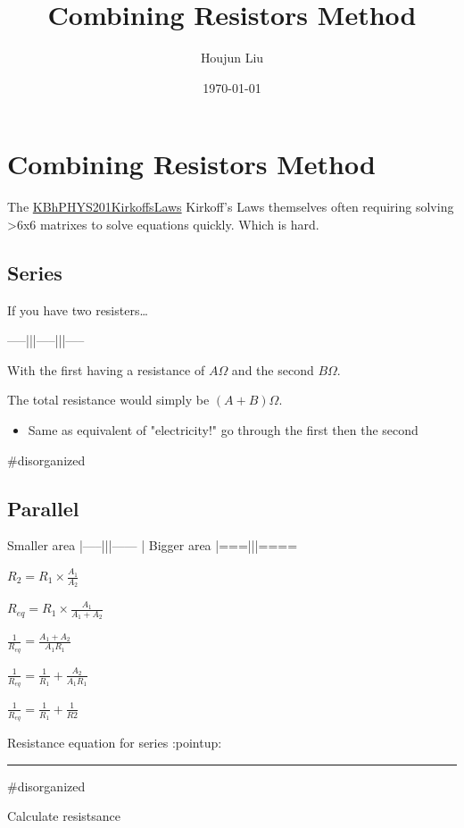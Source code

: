 \documentclass[letterpaper]{article}
\author{Houjun Liu}
\date{\today}
\title{Combining Resistors Method}
\renewcommand{\tableofcontents}{}
\begin{document}
\tableofcontents



\section{Combining Resistors Method}
\label{sec:org4479648}
The \href{KBhPHYS201KirkoffsLaws.org}{KBhPHYS201KirkoffsLaws}
Kirkoff's Laws themselves often requiring solving >6x6 matrixes to solve
equations quickly. Which is hard.

\subsection{Series}
\label{sec:org36223ba}
If you have two resisters\ldots{}

-----|||-----|||-----

With the first having a resistance of \(A\Omega\) and the second
\(B\Omega\).

The total resistance would simply be \((A+B)\Omega\).

\begin{itemize}
\item Same as equivalent of "electricity!" go through the first then the
second
\end{itemize}

\#disorganized

\subsection{Parallel}
\label{sec:orgc3c7925}
Smaller area |-----|||------ | Bigger area |===|||====

\(R_2 = R_1 \times \frac{A_1}{A_2}\)

\(R_{eq} = R_1 \times \frac{A_1}{A_1+A_2}\)

\(\frac{1}{R_{eq}} = \frac{A_1+A_2}{A_1R_1}\)

\(\frac{1}{R_{eq}} = \frac{1}{R_1} + \frac{A_2}{A_1R_1}\)

\(\frac{1}{R_{eq}} = \frac{1}{R_1} + \frac{1}{R2}\)

Resistance equation for series :pointup:

\noindent\rule{\textwidth}{0.5pt}

\#disorganized

Calculate resistsance
\end{document}
